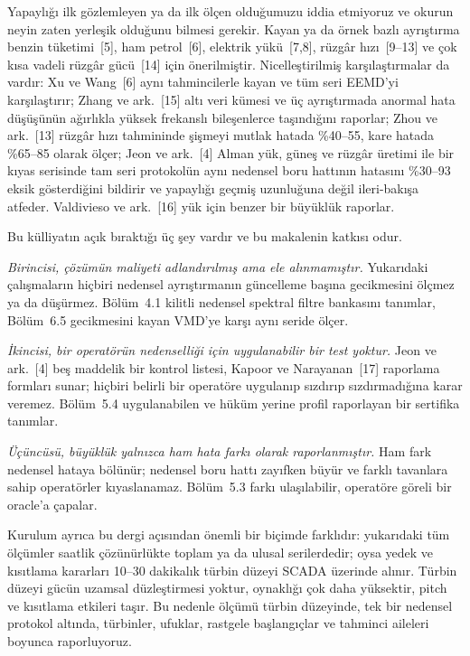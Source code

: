 \documentclass[11pt,a4paper]{article}
\begin{document}
Yapaylığı ilk gözlemleyen ya da ilk ölçen olduğumuzu iddia etmiyoruz ve okurun
neyin zaten yerleşik olduğunu bilmesi gerekir. Kayan ya da örnek bazlı
ayrıştırma benzin tüketimi~[5], ham petrol~[6], elektrik yükü~[7,8], rüzgâr
hızı~[9--13] ve çok kısa vadeli rüzgâr gücü~[14] için önerilmiştir.
Nicelleştirilmiş karşılaştırmalar da vardır: Xu ve Wang~[6] aynı tahmincilerle
kayan ve tüm seri EEMD'yi karşılaştırır; Zhang ve ark.~[15] altı veri kümesi ve
üç ayrıştırmada anormal hata düşüşünün ağırlıkla yüksek frekanslı bileşenlerce
taşındığını raporlar; Zhou ve ark.~[13] rüzgâr hızı tahmininde şişmeyi mutlak
hatada \%40--55, kare hatada \%65--85 olarak ölçer; Jeon ve ark.~[4] Alman yük,
güneş ve rüzgâr üretimi ile bir kıyas serisinde tam seri protokolün aynı
nedensel boru hattının hatasını \%30--93 eksik gösterdiğini bildirir ve
yapaylığı geçmiş uzunluğuna değil ileri-bakışa atfeder.
Valdivieso ve ark.~[16] yük için benzer bir büyüklük raporlar.

Bu külliyatın açık bıraktığı üç şey vardır ve bu makalenin katkısı odur.

\emph{Birincisi, çözümün maliyeti adlandırılmış ama ele alınmamıştır.} Yukarıdaki
çalışmaların hiçbiri nedensel ayrıştırmanın güncelleme başına gecikmesini ölçmez
ya da düşürmez. Bölüm~4.1 kilitli nedensel spektral filtre bankasını tanımlar,
Bölüm~6.5 gecikmesini kayan VMD'ye karşı aynı seride ölçer.

\emph{İkincisi, bir operatörün nedenselliği için uygulanabilir bir test yoktur.}
Jeon ve ark.~[4] beş maddelik bir kontrol listesi, Kapoor ve Narayanan~[17]
raporlama formları sunar; hiçbiri belirli bir operatöre uygulanıp sızdırıp
sızdırmadığına karar veremez. Bölüm~5.4 uygulanabilen ve hüküm yerine profil
raporlayan bir sertifika tanımlar.

\emph{Üçüncüsü, büyüklük yalnızca ham hata farkı olarak raporlanmıştır.} Ham fark
nedensel hataya bölünür; nedensel boru hattı zayıfken büyür ve farklı tavanlara
sahip operatörler kıyaslanamaz. Bölüm~5.3 farkı ulaşılabilir, operatöre göreli
bir oracle'a çapalar.

Kurulum ayrıca bu dergi açısından önemli bir biçimde farklıdır: yukarıdaki tüm
ölçümler saatlik çözünürlükte toplam ya da ulusal serilerdedir; oysa yedek ve
kısıtlama kararları 10--30 dakikalık türbin düzeyi SCADA üzerinde alınır. Türbin
düzeyi gücün uzamsal düzleştirmesi yoktur, oynaklığı çok daha yüksektir, pitch ve
kısıtlama etkileri taşır. Bu nedenle ölçümü türbin düzeyinde, tek bir nedensel
protokol altında, türbinler, ufuklar, rastgele başlangıçlar ve tahminci aileleri
boyunca raporluyoruz.
\end{document}
